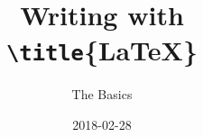 \documentclass[aspectratio=1610,compress,t,gabaritb,french,english]{hecppt}
\title{Writing with \\ \texttt{\textbackslash title}\{\textrm{\LaTeX}\} }
\subtitle{The Basics}
\date[2018-02-28]{2018-02-28}
\begin{document}
\pageTitre








\end{document}
